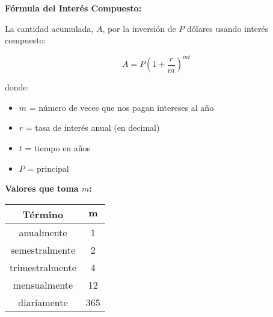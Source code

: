 \begin{definition}
\textbf{Fórmula del Interés Compuesto:}

La cantidad acumulada, $A$, por la inversión de $P$ dólares usando interés compuesto:

$$A = P\left(1 + \frac{r}{m}\right)^{mt}$$

donde:
\begin{itemize}
    \item $m$ = número de veces que nos pagan intereses al año
    \item $r$ = tasa de interés anual (en decimal)
    \item $t$ = tiempo en años
    \item $P$ = principal
\end{itemize}
\end{definition}

\textbf{Valores que toma $m$:}

\begin{center}
\begin{tabular}{|c|c|}
\hline
\textbf{Término} & $\mathbf{m}$ \\
\hline
anualmente & 1 \\
\hline
semestralmente & 2 \\
\hline
trimestralmente & 4 \\
\hline
mensualmente & 12 \\
\hline
diariamente & 365 \\
\hline
\end{tabular}
\end{center}

